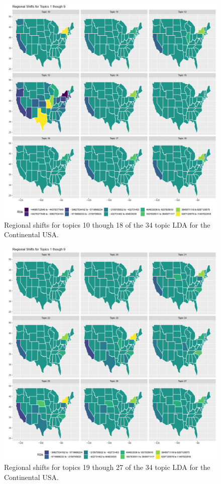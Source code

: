 \begin{figure}
	\centering
	\includegraphics[width=\linewidth]{Figures/ChapterV/States_10_18}
	\caption[Regional shifts using 34 Topic LDA, Topics 10 thought 19]{Regional shifts for topics 10 though 18 of the 34 topic LDA for the Continental USA.}
	\label{fig:shift-share_lda34-10-18}
\end{figure}

\begin{figure}
	\centering
	\includegraphics[width=\linewidth]{Figures/ChapterV/States_19_27}
	\caption[Regional shifts using 34 Topic LDA, Topics 19 thought 27]{Regional shifts for topics 19 though 27 of the 34 topic LDA for the Continental USA.}
	\label{fig:shift-share_lda34-19-27}
\end{figure}


